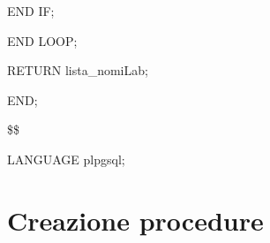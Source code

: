 \begin{flushleft}
\begin{description}
\begin{description}
\begin{description}
                                        \item END IF;
                                    \end{description}
                                    \item END LOOP;
                                    \item RETURN lista\_nomiLab;
                                \end{description}
                                \item END;
                                \item \$\$
                                \item LANGUAGE plpgsql;
                            \end{description}
                        \end{flushleft}
                    \normalfont  

\newpage

    \section{Creazione procedure}

